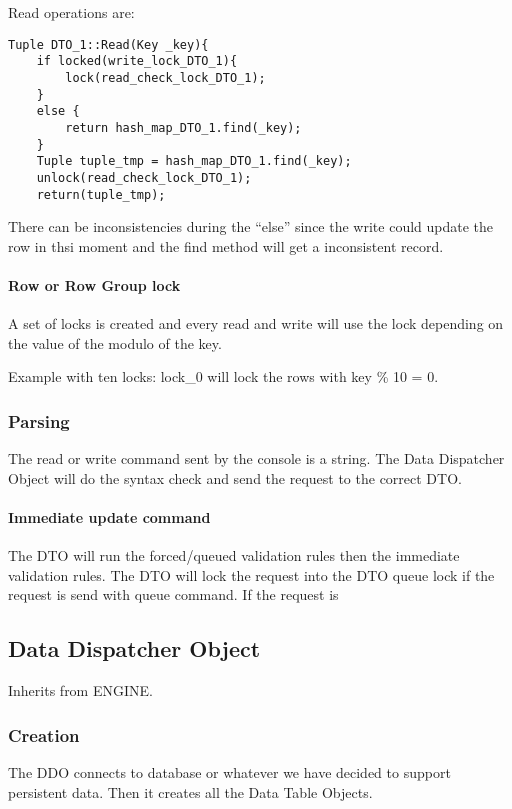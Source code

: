 \documentclass[a4paper]{article}
\begin{document}
Read operations are:

\begin{verbatim}
Tuple DTO_1::Read(Key _key){
    if locked(write_lock_DTO_1){
        lock(read_check_lock_DTO_1);
    }
    else {
        return hash_map_DTO_1.find(_key);
    }
    Tuple tuple_tmp = hash_map_DTO_1.find(_key);
    unlock(read_check_lock_DTO_1);
    return(tuple_tmp);
\end{verbatim}

There can be inconsistencies during the ``else'' since the write could update
the row in thsi moment and the find method will get a inconsistent record.

\paragraph{Row or Row Group lock}
A set of locks is created and every read and write will use the lock depending
on the value of the modulo of the key.

Example with ten locks: lock\_0 will lock the rows with key \% 10 = 0.

\subsubsection{Parsing}
The read or write command sent by the console is a string. The Data Dispatcher
Object will do the syntax check and send the request to the correct DTO.
\paragraph{Immediate update command}
The DTO will run the forced/queued validation rules then the immediate
validation rules.
The DTO will lock the request into the DTO queue lock if the
request is send with queue command. If the request is 

\subsection{Data Dispatcher Object}

Inherits from ENGINE. 
\subsubsection{Creation}
The DDO connects to database or whatever we have decided to support persistent
data. Then it creates all the Data Table Objects.
\end{document}
